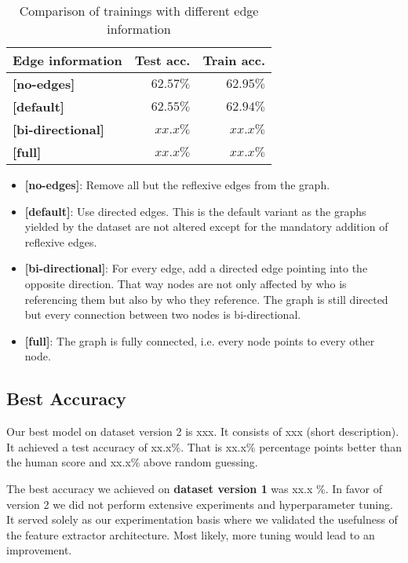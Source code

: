\begin{table}
    \centering
    \begin{tabular}{lrr}
        \textbf{Edge information} & \textbf{Test acc.} & \textbf{Train acc.}\\\hline
        \textbf{[no-edges]} & $62.57\%$ & $62.95\%$\\
        \textbf{[default]} & $62.55\%$ & $62.94\%$\\
        \textbf{[bi-directional]} & $xx.x\%$ & $xx.x\%$\\
        \textbf{[full]} & $xx.x\%$ & $xx.x\%$\\
    \end{tabular}
    \caption[Comparison of trainings with different edge information]{Comparison of trainings with different edge information}
    \label{tab:edgecomparison}
\end{table}

\begin{itemize}
    \item \textbf{[no-edges]}: Remove all but the reflexive edges from the graph.
    \item \textbf{[default]}: Use directed edges. This is the default variant as the graphs yielded by the dataset are not altered except for the mandatory addition of reflexive edges.
    \item \textbf{[bi-directional]}: For every edge, add a directed edge pointing into the opposite direction. That way nodes are not only affected by who is referencing them but also by who they reference. The graph is still directed but every connection between two nodes is bi-directional.
    \item \textbf{[full]}: The graph is fully connected, i.e. every node points to every other node.
\end{itemize}

\subsection{Best Accuracy}

Our best model on dataset version 2 is xxx. It consists of xxx (short description). It achieved a test accuracy of xx.x\%. That is xx.x\% percentage points better than the human score and xx.x\% above random guessing.

The best accuracy we achieved on \textbf{dataset version 1} was xx.x \%. In favor of version 2 we did not perform extensive experiments and hyperparameter tuning. It served solely as our experimentation basis where we validated the usefulness of the feature extractor architecture. Most likely, more tuning would lead to an improvement.
